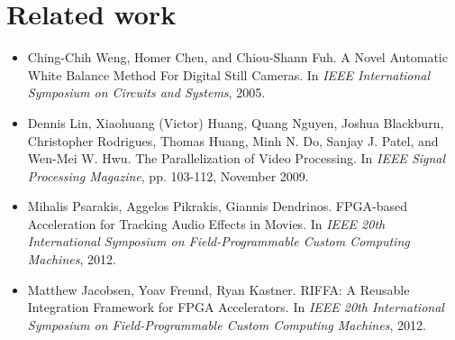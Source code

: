 \documentclass{acm_proc_article-sp}
\begin{document}
\section{Related work}
\begin{itemize}
\item Ching-Chih Weng, Homer Chen, and Chiou-Shann Fuh. A Novel Automatic White Balance Method For Digital Still Cameras. In \textit{IEEE International Symposium on Circuits and Systems}, 2005.
\item Dennis Lin, Xiaohuang (Victor) Huang, Quang Nguyen, Joshua Blackburn, Christopher Rodrigues, Thomas Huang, Minh N. Do, Sanjay J. Patel, and Wen-Mei W. Hwu. The Parallelization of Video Processing. In \textit{IEEE Signal Processing Magazine}, pp. 103-112, November 2009.
\item Mihalis Psarakis, Aggelos Pikrakis, Giannis Dendrinos. FPGA-based Acceleration for Tracking Audio Effects in Movies. In \textit{IEEE 20th International Symposium on Field-Programmable Custom Computing Machines}, 2012.
\item Matthew Jacobsen, Yoav Freund, Ryan Kastner. RIFFA: A Reusable Integration Framework for FPGA Accelerators. In \textit{IEEE 20th International Symposium on Field-Programmable Custom Computing Machines}, 2012.
\end{itemize}
\end{document}
